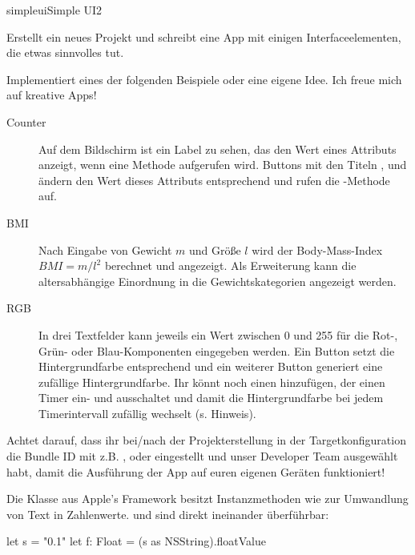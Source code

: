 \documentclass[parskip=half, final]{scrreprt}
\begin{document}
\begin{lecture}
\begin{enumerate}

\end{enumerate}

\begin{exc}

\begin{excitem}{simpleui}{Simple UI}{2}

Erstellt ein neues Projekt und schreibt eine App mit einigen Interfaceelementen, die etwas sinnvolles tut.

Implementiert eines der folgenden Beispiele oder eine eigene Idee. Ich freue mich auf kreative Apps!

\begin{description}
\item[Counter] Auf dem Bildschirm ist ein Label zu sehen, das den Wert eines Attributs  anzeigt, wenn eine Methode  aufgerufen wird. Buttons mit den Titeln ,  und  ändern den Wert dieses Attributs entsprechend und rufen die -Methode auf.
\item[BMI] Nach Eingabe von Gewicht $m$ und Größe $l$ wird der Body-Mass-Index $BMI=m/l^2$ berechnet und angezeigt. Als Erweiterung kann die altersabhängige Einordnung in die Gewichtskategorien angezeigt werden.
\item[RGB] In drei Textfelder kann jeweils ein Wert zwischen 0 und 255 für die Rot-, Grün- oder Blau-Komponenten eingegeben werden. Ein Button setzt die Hintergrundfarbe  entsprechend und ein weiterer Button generiert eine zufällige Hintergrundfarbe. Ihr könnt noch einen  hinzufügen, der einen Timer ein- und ausschaltet und damit die Hintergrundfarbe bei jedem Timerintervall zufällig wechselt (s. Hinweis).
\end{description}

\begin{exchinweise}
\item Achtet darauf, dass ihr bei/nach der Projekterstellung in der Targetkonfiguration die Bundle ID  mit  z.B. ,  oder  eingestellt und unser Developer Team ausgewählt habt, damit die Ausführung der App auf euren eigenen Geräten funktioniert!
\item Die Klasse  aus Apple's  Framework besitzt Instanzmethoden wie  zur Umwandlung von Text in Zahlenwerte.  und  sind direkt ineinander überführbar:
	\begin{swiftcode}
    let s = "0.1"
    let f: Float = (s as NSString).floatValue
	\end{swiftcode}


\end{exchinweise}
\end{excitem}
\end{exc}
\end{lecture}
\end{document}
